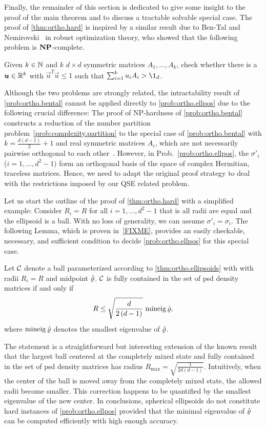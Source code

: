 Finally, the remainder of this section is dedicated to give some insight to the proof of the main theorem and to discuss a tractable solvable special case.
The proof of \cref{thm:ortho.hard} is inspired by a similar result due to Ben-Tal and Nemirovski~\cite{Tal_1998_Robust} in robust optimization theory, who showed that the following problem is $\mathbf{NP}$-complete.
\begin{problem}
  \label{prob:ortho.bental}
  Given $k \in \mathbb{N}$ and $k$ $d\times d$ symmetric matrices $A_{1},\ldots,A_{k}$, check whether there is a $\boldsymbol{u} \in \mathbb{R}^k$ with $\vec{u}^{T}\vec{u} \leq 1$ such that $\sum_{i=1}^{k}u_{i}A_{i} > \1_{d}$.
\end{problem}
Although the two problems are strongly related, the intractability result of \cref{prob:ortho.bental} cannot be applied directly to \cref{prob:ortho.ellpos} due to the following crucial difference:
The proof of NP-hardness of \cref{prob:ortho.bental} constructs a reduction of the number partition problem~\ref{prob:complexity.partition} to the special case of \cref{prob:ortho.bental} with $k=\frac{d(d-1)}{2} + 1$ and real symmetric matrices $A_i$, which are not necessarily pairwise orthogonal to each other~\cite[Sec.~3.4.1]{Tal_1998_Robust}.
However, in Prob.~\ref{prob:ortho.ellpos}, the $\sigma'_i$ ($i=1,\ldots,d^2 - 1)$ form an orthogonal basis of the space of complex Hermitian, traceless matrices.
Hence, we need to adapt the original proof strategy to deal with the restrictions imposed by our QSE related problem.

Let us start the outline of the proof of \cref{thm:ortho.hard} with a simplified example:
Consider $R_{i}=R$ for all $i=1,\ldots,d^{2}-1$ that is all radii are equal and the ellipsoid is a ball.
With no loss of generality, we can assume $\sigma'_i = \sigma_i$.
The following Lemma, which is proven in~\cref{FIXME}, provides an easily checkable, necessary, and sufficient condition to decide \cref{prob:ortho.ellpos} for this special case.
\begin{lemma}\label{lem:ortho.spheres}
  Let $\mathcal{C}$ denote a ball parameterized according to \cref{thm:ortho.ellipsoids} with with radii $R_i=R$ and midpoint $\hat{\varrho}$.
  $\mathcal{C}$ is fully contained in the set of psd density matrices if and only if
  \[
    R\leq\sqrt{\frac{d}{2\left(d-1\right)}} \, \operatorname{mineig} \hat{\varrho},
  \]
  where $\operatorname{mineig}\hat{\varrho}$ denotes the smallest eigenvalue of $\hat{\varrho}$.
\end{lemma}
The statement is a straightforward but interesting extension of the known result that the largest ball centered at the completely mixed state and fully contained in the set of psd density matrices has radius $R_{\mathrm{max}}=\sqrt{\frac{1}{2d\left(d-1\right)}}$.
Intuitively, when the center of the ball is moved away from the completely mixed state, the allowed radii become smaller.
This correction happens to be quantified by the smallest eigenvalue of the new center.
In conclusions, spherical ellipsoids do not constitute hard instances of \cref{prob:ortho.ellpos} provided that the minimal eigenvalue of $\hat{\varrho}$ can be computed efficiently with high enough accuracy.

